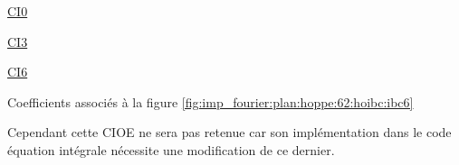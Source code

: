     \begin{table}[!hbt]
      \centering
      \begin{minipage}[t]{0.49\textwidth}
        \vspace{0pt}
        \centering
        \begin{coefftable}{\hyperlink{ci0}{CI0}}
          
        \end{coefftable}
        \begin{coefftable}{\hyperlink{ci3}{CI3}}
          
        \end{coefftable}
      \end{minipage}
      \begin{minipage}[t]{0.49\textwidth}
        \vspace{0pt}
        \centering
        \begin{coefftable}{\hyperlink{ci6}{CI6}}
          
        \end{coefftable}
      \end{minipage}
      \caption{Coefficients associés à la figure \ref{fig:imp_fourier:plan:hoppe:62:hoibc:ibc6}}
      \label{tab:imp_fourier:plan:hoppe:62:hoibc:ibc6}
    \end{table}

    Cependant cette CIOE ne sera pas retenue car son implémentation dans le code équation intégrale nécessite une modification de ce dernier.


